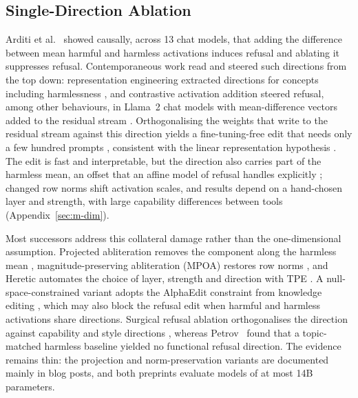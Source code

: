 \subsection{Single-Direction Ablation}

Arditi et al.~\cite{arditi2024refusal} showed causally, across 13 chat models,
that adding the difference between mean harmful and harmless activations
induces refusal and ablating it suppresses refusal. Contemporaneous work read
and steered such directions from the top down: representation engineering
extracted directions for concepts including harmlessness
\cite{zou2023representation}, and contrastive activation addition steered
refusal, among other behaviours, in Llama~2 chat models with mean-difference
vectors added to the residual stream \cite{panickssery2023steering}.
Orthogonalising
the weights that write to the residual stream against this direction yields a
fine-tuning-free edit that needs only a few hundred prompts
\cite{labonne2024abliteration,failspy_abliterator}, consistent with the linear
representation hypothesis \cite{park2024linear}. The edit is fast and
interpretable, but the direction also carries part of the harmless mean, an
offset that an affine model of refusal handles explicitly
\cite{marshall2024refusal}; changed row norms shift activation scales, and
results depend on a hand-chosen layer and strength, with large capability
differences between tools \cite{young2025comparative}
(Appendix~\ref{sec:m-dim}).

Most successors address this collateral damage rather than the
one-dimensional assumption. Projected abliteration removes the component along
the harmless mean \cite{lai2024projected}, magnitude-preserving abliteration
(MPOA) restores row norms \cite{lai2025mpoa}, and Heretic automates the choice
of layer, strength and direction with TPE \cite{heretic2025,akiba2019optuna}. A
null-space-constrained variant \cite{jwest33abliterator} adopts the AlphaEdit
constraint from knowledge editing \cite{fang2025alphaedit,meng2022locating},
which may also block the refusal edit when harmful and harmless activations
share directions. Surgical refusal ablation orthogonalises the direction
against capability and style directions \cite{cristofano2026surgical}, whereas
Petrov~\cite{petrov2026on} found that a topic-matched harmless baseline yielded
no functional refusal direction. The evidence remains thin: the projection and
norm-preservation variants are documented mainly in blog posts, and both
preprints evaluate models of at most 14B parameters.

